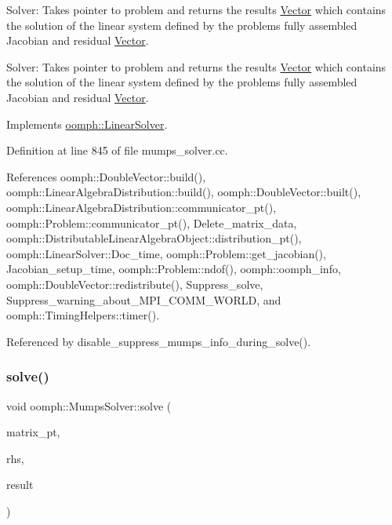 Solver\+: Takes pointer to problem and returns the results \hyperlink{classoomph_1_1Vector}{Vector} which contains the solution of the linear system defined by the problem\textquotesingle{}s fully assembled Jacobian and residual \hyperlink{classoomph_1_1Vector}{Vector}. 

Solver\+: Takes pointer to problem and returns the results \hyperlink{classoomph_1_1Vector}{Vector} which contains the solution of the linear system defined by the problem\textquotesingle{}s fully assembled Jacobian and residual \hyperlink{classoomph_1_1Vector}{Vector}. 

Implements \hyperlink{classoomph_1_1LinearSolver_a15ce22542b74ed1826ea485edacbeb6e}{oomph\+::\+Linear\+Solver}.



Definition at line 845 of file mumps\+\_\+solver.\+cc.



References oomph\+::\+Double\+Vector\+::build(), oomph\+::\+Linear\+Algebra\+Distribution\+::build(), oomph\+::\+Double\+Vector\+::built(), oomph\+::\+Linear\+Algebra\+Distribution\+::communicator\+\_\+pt(), oomph\+::\+Problem\+::communicator\+\_\+pt(), Delete\+\_\+matrix\+\_\+data, oomph\+::\+Distributable\+Linear\+Algebra\+Object\+::distribution\+\_\+pt(), oomph\+::\+Linear\+Solver\+::\+Doc\+\_\+time, oomph\+::\+Problem\+::get\+\_\+jacobian(), Jacobian\+\_\+setup\+\_\+time, oomph\+::\+Problem\+::ndof(), oomph\+::oomph\+\_\+info, oomph\+::\+Double\+Vector\+::redistribute(), Suppress\+\_\+solve, Suppress\+\_\+warning\+\_\+about\+\_\+\+M\+P\+I\+\_\+\+C\+O\+M\+M\+\_\+\+W\+O\+R\+LD, and oomph\+::\+Timing\+Helpers\+::timer().



Referenced by disable\+\_\+suppress\+\_\+mumps\+\_\+info\+\_\+during\+\_\+solve().

\mbox{\label{classoomph_1_1MumpsSolver_a3995dcf46675fc443b4d373d348a0fdf}} 
\subsubsection{\texorpdfstring{solve()}{solve()}\hspace{0.1cm}{\footnotesize\ttfamily [2/2]}}
{\footnotesize\ttfamily void oomph\+::\+Mumps\+Solver\+::solve (\begin{DoxyParamCaption}\item[{\hyperlink{classoomph_1_1DoubleMatrixBase}{Double\+Matrix\+Base} $\ast$const \&}]{matrix\+\_\+pt,  }\item[{const \hyperlink{classoomph_1_1DoubleVector}{Double\+Vector} \&}]{rhs,  }\item[{\hyperlink{classoomph_1_1DoubleVector}{Double\+Vector} \&}]{result }\end{DoxyParamCaption})\hspace{0.3cm}{\ttfamily [virtual]}}



